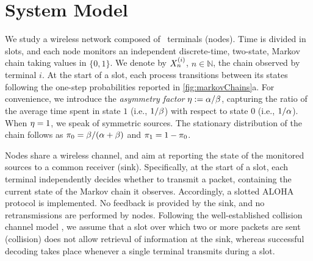 \section{System Model}
\label{sec:sysModel}

We study a wireless network composed of \nodes\ terminals (nodes). Time is divided in slots, and each node monitors an independent discrete-time, two-state, Markov chain taking values in $\{0,1\}$. We denote by $X_n^{(i)}$, $n\in\mathbb N$, the chain observed by terminal $i$. 
At the start of a slot, each process transitions between its states following the one-step probabilities reported in \figr\ref{fig:markovChains}a. For convenience, we introduce the \emph{asymmetry factor} $\eta := \alpha/\beta$, capturing the ratio of the average time spent in state $1$ (i.e., $1/\beta$) with respect to state $0$ (i.e., $1/\alpha$). When $\eta=1$, we speak of symmetric sources. The stationary distribution of the chain follows as $\pi_0 = \beta/(\alpha+\beta)$ and $\pi_1 = 1-\pi_0$.

Nodes share a wireless channel, and aim at reporting the state of the monitored sources to a common receiver (sink). Specifically, at the start of a slot, each terminal independently decides whether to transmit a packet, containing the current state of the Markov chain it observes. Accordingly, a slotted ALOHA protocol is implemented. No feedback is provided by the sink, and no retransmissions are performed by nodes. Following the well-established collision channel model \cite{Abramson77:PacketBroadcasting}, we assume that a slot over which two or more packets are sent (collision) does not allow retrieval of information at the sink, whereas successful decoding takes place whenever a single terminal transmits during a slot. 

